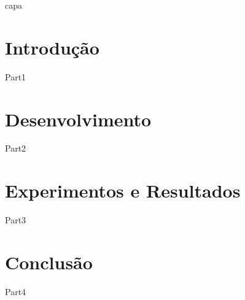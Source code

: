 \documentclass[11pt,a4paper]{article}
\begin{document}
    {capa} 
    \myemptypage %
    \thispagestyle{empty}
    \listoffigures
    \listoftables
    \newpage
    \tableofcontents
    \newpage
    \setlength{\parindent}{0cm}
    \part{Introdução}
        {Part1}
    \part{Desenvolvimento}
        {Part2}
    \part{Experimentos e Resultados}
        {Part3}
    \part{Conclusão}
        {Part4}
\end{document}
